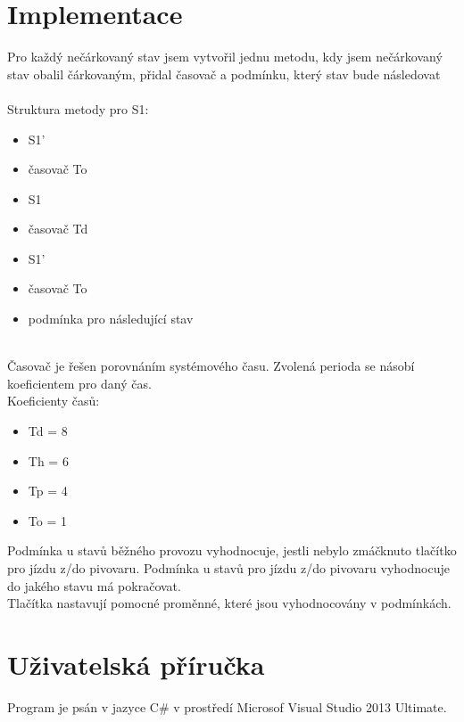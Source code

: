 \documentclass[12pt, a4paper]{report}
\begin{document}


\chapter{Implementace}
Pro každý nečárkovaný stav jsem vytvořil jednu metodu, kdy jsem nečárkovaný stav obalil čárkovaným, přidal časovač a podmínku, který stav bude následovat\\
\\
Struktura metody pro S1:

\begin{itemize}
\item S1'
\item	časovač To
\item S1
\item časovač Td
\item S1'
\item časovač To
\item podmínka pro následující stav
\end{itemize}
\\
\noindent
Časovač je řešen porovnáním systémového času. Zvolená perioda se násobí koeficientem pro daný čas.\\
Koeficienty časů:

\begin{itemize}
\item Td = 8
\item	Th = 6
\item Tp = 4
\item To = 1
\end{itemize}

\noindent
Podmínka u stavů běžného provozu vyhodnocuje, jestli nebylo zmáčknuto tlačítko pro jízdu z/do pivovaru. Podmínka u stavů pro jízdu z/do pivovaru vyhodnocuje do jakého stavu má pokračovat.\\
Tlačítka nastavují pomocné proměnné, které jsou vyhodnocovány v  podmínkách.



\chapter{Uživatelská příručka}

Program je psán v jazyce C# v prostředí Microsof Visual Studio 2013 Ultimate.
\end{document}
